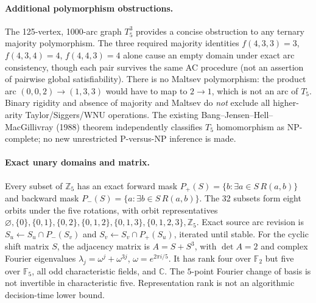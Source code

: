 \documentclass[11pt]{article}
\begin{document}
\paragraph{Additional polymorphism obstructions.}
The 125-vertex, 1000-arc graph $T_5^3$ provides a concise
obstruction to any ternary majority polymorphism. The three
required majority identities
$f(4,3,3)=3$, $f(4,3,4)=4$, $f(4,4,3)=4$
alone cause an empty domain under exact arc consistency, though
each pair survives the same AC procedure (not an assertion of
pairwise global satisfiability). There is no Maltsev polymorphism:
the product arc $(0,0,2)\to(1,3,3)$ would have to map to
$2\to1$, which is not an arc of $T_5$. Binary rigidity and
absence of majority and Maltsev do \emph{not} exclude all
higher-arity Taylor/Siggers/WNU operations. The existing
Bang--Jensen--Hell--MacGillivray (1988) theorem independently
classifies $T_5$ homomorphism as NP-complete; no new
unrestricted P-versus-NP inference is made.

\paragraph{Exact unary domains and matrix.}
Every subset of $\mathbb Z_5$ has an exact forward mask
$P_+(S)=\{b:\exists a\in S\,R(a,b)\}$ and backward mask
$P_-(S)=\{a:\exists b\in S\,R(a,b)\}$.
The 32 subsets form eight orbits under the five rotations,
with orbit representatives
$\varnothing,\{0\},\{0,1\},\{0,2\},\{0,1,2\},
\{0,1,3\},\{0,1,2,3\},\mathbb Z_5$.
Exact source arc revision is $S_u\leftarrow S_u\cap P_-(S_v)$
and $S_v\leftarrow S_v\cap P_+(S_u)$, iterated until stable.
For the cyclic shift matrix $S$, the adjacency matrix is
$A=S+S^3$, with $\det A=2$ and complex Fourier eigenvalues
$\lambda_j=\omega^j+\omega^{3j}$, $\omega=e^{2\pi i/5}$.
It has rank four over $\mathbb F_2$ but five over
$\mathbb F_5$, all odd characteristic fields, and $\mathbb C$.
The $5$-point Fourier change of basis is not invertible in
characteristic five. Representation rank is not an algorithmic
decision-time lower bound.
\end{document}
